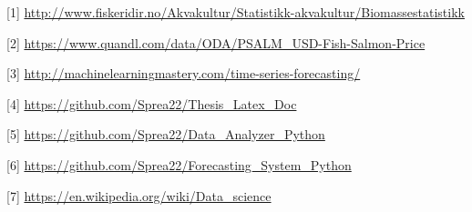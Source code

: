 
[1] \url{http://www.fiskeridir.no/Akvakultur/Statistikk-akvakultur/Biomassestatistikk}


[2] \url{https://www.quandl.com/data/ODA/PSALM_USD-Fish-Salmon-Price}


[3] \url{http://machinelearningmastery.com/time-series-forecasting/}


[4] \url{https://github.com/Sprea22/Thesis_Latex_Doc}


[5] \url{https://github.com/Sprea22/Data_Analyzer_Python}


[6] \url{https://github.com/Sprea22/Forecasting_System_Python}

[7] \url{https://en.wikipedia.org/wiki/Data_science}